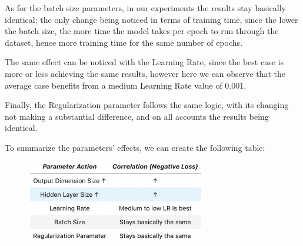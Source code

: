 {As for the batch size parameters, in our experiments the results stay basically identical; the only change being noticed in terms of training time, since the lower the batch size, the more time the model takes per epoch to run through the dataset, hence more training time for the same number of epochs. 

The same effect can be noticed with the Learning Rate, since the best case is more or less achieving the same results, however here we can observe that the average case benefits from a medium Learning Rate value of 0.001. 

Finally, the Regularization parameter follows the same logic, with its changing not making a substantial difference, and on all accounts the results being identical. 

To summarize the parameters' effects, we can create the following table:

\begin{figure}[H]
    \centering
    \includegraphics[width=0.7\textwidth]{figures/DCCA_optimizations/Raw_Conclusions.png}
    \caption{}
\end{figure}

}
